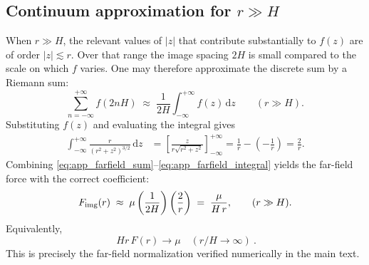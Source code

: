 \documentclass[11pt]{article}
\newcommand{\dd}{\mathrm{d}}
\begin{document}
\subsection{Continuum approximation for $r\gg H$}
When $r\gg H$, the relevant values of $|z|$ that contribute substantially to $f(z)$ are of order
$|z|\lesssim r$.  Over that range the image spacing $2H$ is small compared to the scale on which
$f$ varies.  One may therefore approximate the discrete sum by a Riemann sum:
\begin{equation}
  \sum_{n=-\infty}^{+\infty} f(2nH)
  \;\approx\;
  \frac{1}{2H}\int_{-\infty}^{+\infty} f(z)\,\dd z
  \qquad (r\gg H).
  \label{eq:app_farfield_riemann}
\end{equation}
Substituting $f(z)$ and evaluating the integral gives
\begin{align}
  \int_{-\infty}^{+\infty} \frac{r}{(r^2+z^2)^{3/2}}\,\dd z
  &= \left[ \frac{z}{r\sqrt{r^2+z^2}} \right]_{-\infty}^{+\infty}
   = \frac{1}{r}-\left(-\frac{1}{r}\right)
   = \frac{2}{r}.
  \label{eq:app_farfield_integral}
\end{align}
Combining \eqref{eq:app_farfield_sum}--\eqref{eq:app_farfield_integral} yields the far-field force
with the correct coefficient:
\begin{equation}
  F_{\rm img}(r)
  \;\approx\;
  \mu \left(\frac{1}{2H}\right)\left(\frac{2}{r}\right)
  \;=\;
  \frac{\mu}{H\,r},
  \qquad (r\gg H).
  \label{eq:app_farfield_result}
\end{equation}
Equivalently,
\begin{equation}
  \boxed{\ Hr\,F(r)\to \mu \quad (r/H\to\infty)\ }.
\end{equation}
This is precisely the far-field normalization verified numerically in the main text.
\end{document}
